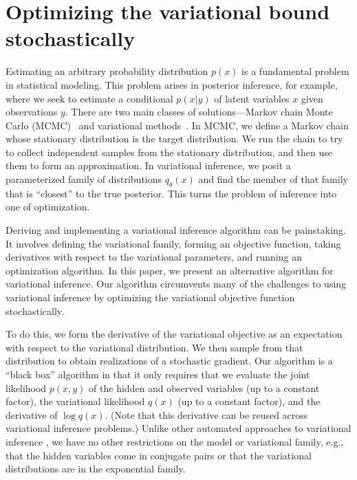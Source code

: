 \chapter{Optimizing the variational bound stochastically}
\label{chapter:stochastic_variational_optimization}

Estimating an arbitrary probability distribution $p(x)$ is a
fundamental problem in statistical modeling.  This problem arises in
posterior inference, for example, where we seek to estimate a
conditional $p(x | y)$ of latent variables $x$ given observations $y$.
There are two main classes of solutions---Markov chain Monte Carlo
(MCMC)~\cite{bishop:2006} and variational methods~\cite{jordan:1999}.
In MCMC, we define a Markov chain whose stationary distribution is the
target distribution.  We run the chain to try to collect independent
samples from the stationary distribution, and then use them to form an
approximation.  In variational inference, we posit a parameterized
family of distributions $q_\theta(x)$ and find the member of that
family that is ``closest'' to the true posterior.  This turns the
problem of inference into one of optimization.

Deriving and implementing a variational inference algorithm can be
painstaking.  It involves defining the variational family, forming an
objective function, taking derivatives with respect to the variational
parameters, and running an optimization algorithm.  In this paper, we
present an alternative algorithm for variational inference.  Our
algorithm circumvents many of the challenges to using variational
inference by optimizing the variational objective function
stochastically.

To do this, we form the derivative of the variational objective as an
expectation with respect to the variational distribution. We then
sample from that distribution to obtain realizations of a stochastic
gradient.  Our algorithm is a ``black box'' algorithm in that it only
requires that we evaluate the joint likelihood $p(x, y)$ of the hidden
and observed variables (up to a constant factor), the variational
likelihood $q(x)$ (up to a constant factor), and the derivative of
$\log q(x)$.  (Note that this derivative can be reused across
variational inference problems.)  Unlike other automated approaches to
variational inference \cite{winn:2004}, we have no other restrictions
on the model or variational family, e.g., that the hidden variables
come in conjugate pairs or that the variational distributions are in
the exponential family.

